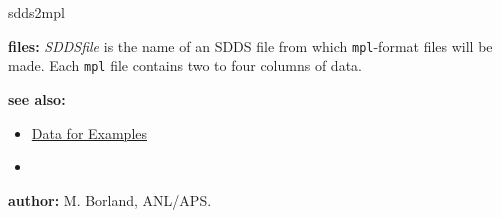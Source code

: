 \begin{sddsprog}{sdds2mpl}
\item \textbf{files:}
  {\em SDDSfile} is the name of an SDDS file from which {\tt mpl}-format files will be made. Each {\tt mpl} file contains two to four columns of data.

\item \textbf{see also:}
  \begin{itemize}
  \item \hyperref[exampleData]{Data for Examples}
  \item {}
  \end{itemize}

\item \textbf{author:} M. Borland, ANL/APS.
\end{sddsprog}

